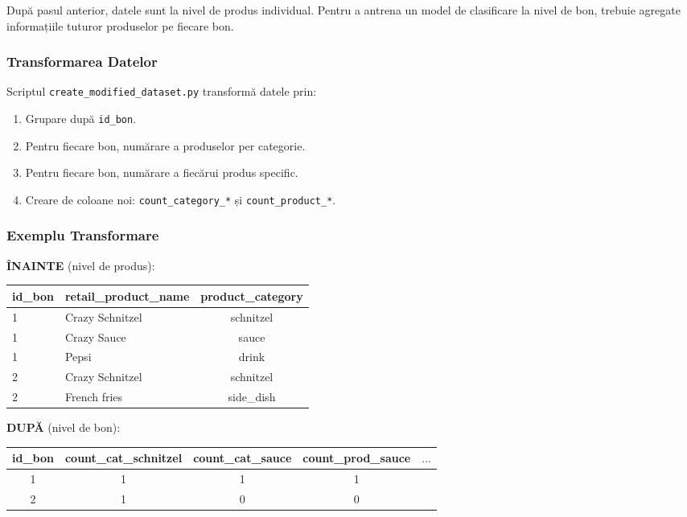 \documentclass[12pt,a4paper]{article}
\begin{document}
După pasul anterior, datele sunt la nivel de produs individual. Pentru a antrena un model de clasificare la nivel de bon, trebuie agregate informațiile tuturor produselor pe fiecare bon.

\subsubsection*{Transformarea Datelor}

Scriptul \texttt{create\_modified\_dataset.py} transformă datele prin:

\begin{enumerate}
    \item Grupare după \texttt{id\_bon}.
    \item Pentru fiecare bon, numărare a produselor per categorie.
    \item Pentru fiecare bon, numărare a fiecărui produs specific.
    \item Creare de coloane noi: \texttt{count\_category\_*} și \texttt{count\_product\_*}.
\end{enumerate}

\subsubsection*{Exemplu Transformare}

\textbf{ÎNAINTE} (nivel de produs):

\begin{table}[h]
\centering
\begin{tabular}{llc}
\toprule
\textbf{id\_bon} & \textbf{retail\_product\_name} & \textbf{product\_category} \\
\midrule
1 & Crazy Schnitzel & schnitzel \\
1 & Crazy Sauce & sauce \\
1 & Pepsi & drink \\
2 & Crazy Schnitzel & schnitzel \\
2 & French fries & side\_dish \\
\bottomrule
\end{tabular}
\end{table}

\vspace{0.5cm}

\textbf{DUPĂ} (nivel de bon):

\begin{table}[h]
\centering
\begin{tabular}{ccccc}
\toprule
\textbf{id\_bon} & \textbf{count\_cat\_schnitzel} & \textbf{count\_cat\_sauce} & \textbf{count\_prod\_sauce} & $\ldots$ \\
\midrule
1 & 1 & 1 & 1 & \\
2 & 1 & 0 & 0 & \\
\bottomrule
\end{tabular}
\end{table}
\end{document}
